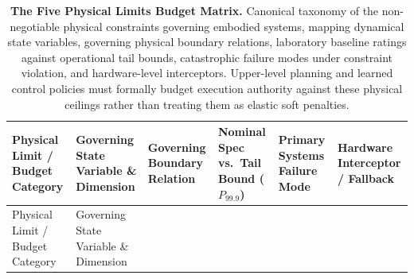 \documentclass[
  letterpaper,
  DIV=11,
  numbers=noendperiod]{scrartcl}
\begin{document}
\begin{longtable}[]{@{}
  >{\raggedright\arraybackslash}p{}
  >{\raggedright\arraybackslash}p{}
  >{\raggedright\arraybackslash}p{}
  >{\raggedright\arraybackslash}p{}
  >{\raggedright\arraybackslash}p{}
  >{\raggedright\arraybackslash}p{}@{}}
\caption{\textbf{The Five Physical Limits Budget Matrix.} Canonical
taxonomy of the non-negotiable physical constraints governing embodied
systems, mapping dynamical state variables, governing physical boundary
relations, laboratory baseline ratings against operational tail bounds,
catastrophic failure modes under constraint violation, and
hardware-level interceptors. Upper-level planning and learned control
policies must formally budget execution authority against these physical
ceilings rather than treating them as elastic soft
penalties.}\label{tbl-02-physical-limits}\tabularnewline
\toprule\noalign{}
\begin{minipage}[b]{\linewidth}\raggedright
Physical Limit / Budget Category
\end{minipage} & \begin{minipage}[b]{\linewidth}\raggedright
Governing State Variable \& Dimension
\end{minipage} & \begin{minipage}[b]{\linewidth}\raggedright
Governing Boundary Relation
\end{minipage} & \begin{minipage}[b]{\linewidth}\raggedright
Nominal Spec vs.~Tail Bound (\(P_{99.9}\))
\end{minipage} & \begin{minipage}[b]{\linewidth}\raggedright
Primary Systems Failure Mode
\end{minipage} & \begin{minipage}[b]{\linewidth}\raggedright
Hardware Interceptor / Fallback
\end{minipage} \\
\midrule\noalign{}
\endfirsthead
\toprule\noalign{}
\begin{minipage}[b]{\linewidth}\raggedright
Physical Limit / Budget Category
\end{minipage} & \begin{minipage}[b]{\linewidth}\raggedright
Governing State Variable \& Dimension
\end{minipage} & \begin{minipage}[b]{\linewidth}\raggedright

\end{minipage}
\end{longtable}
\end{document}
